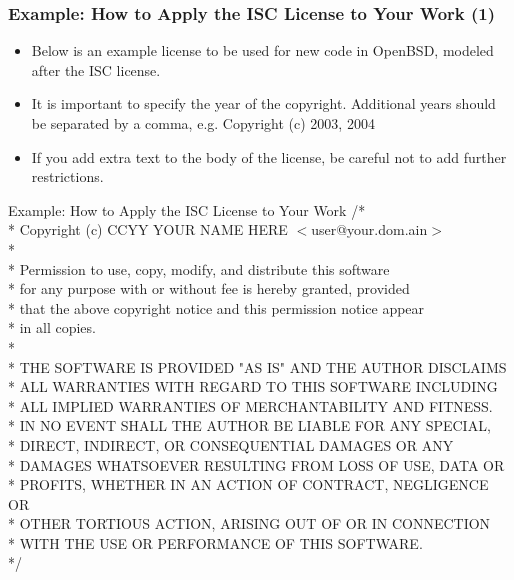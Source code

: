 
\begin{frame}
\frametitle{Example: How to Apply the ISC License to Your Work (1)}

\begin{itemize}
\item Below is an example license to be used for new code in OpenBSD,
modeled after the ISC license.
\item It is important to specify the year of the copyright.  Additional years
should be separated by a comma, e.g.
    Copyright (c) 2003, 2004
\item If you add extra text to the body of the license, be careful not to
add further restrictions.
\end{itemize}

\end{frame}


\begin{frame}

\begin{block}{Example: How to Apply the ISC License to Your Work}
\footnotesize
/* \\
 * Copyright (c) CCYY YOUR NAME HERE $<$user@your.dom.ain$>$ \\
 * \\
 * Permission to use, copy, modify, and distribute this software \\
 * for any purpose with or without fee is hereby granted, provided \\
 * that the above copyright notice and this permission notice appear \\
 * in all copies. \\
 * \\
 * THE SOFTWARE IS PROVIDED "AS IS" AND THE AUTHOR DISCLAIMS \\
 * ALL WARRANTIES WITH REGARD TO THIS SOFTWARE INCLUDING \\
 * ALL IMPLIED WARRANTIES OF MERCHANTABILITY AND FITNESS. \\
 * IN NO EVENT SHALL THE AUTHOR BE LIABLE FOR ANY SPECIAL, \\
 * DIRECT, INDIRECT, OR CONSEQUENTIAL DAMAGES OR ANY \\
 * DAMAGES WHATSOEVER RESULTING FROM LOSS OF USE, DATA OR \\
 * PROFITS, WHETHER IN AN ACTION OF CONTRACT, NEGLIGENCE OR \\
 * OTHER TORTIOUS ACTION, ARISING OUT OF OR IN CONNECTION \\
 * WITH THE USE OR PERFORMANCE OF THIS SOFTWARE. \\
 */
\end{block}

\end{frame}



